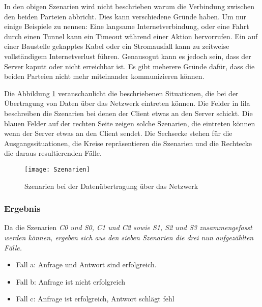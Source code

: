 %
%
In den obigen Szenarien wird nicht beschrieben warum die Verbindung zwischen den beiden Parteien abbricht. Dies kann verschiedene Gründe haben.
Um nur einige Beispiele zu nennen: Eine langsame Internetverbindung, oder eine Fahrt durch einen Tunnel kann ein Timeout während einer Aktion hervorrufen.
Ein auf einer Baustelle gekapptes Kabel oder ein Stromausfall kann zu zeitweise vollständigem Internetverlust führen.
Genausogut kann es jedoch sein, dass der Server kaputt oder nicht erreichbar ist. Es gibt meherere Gründe dafür, dass die beiden Parteien nicht mehr miteinander kommunizieren können.

Die Abbildung \ref{fig:szenarien} veranschaulicht die beschriebenen Situationen, die bei der Übertragung von Daten über das Netzwerk eintreten können.
Die Felder in lila beschreiben die Szenarien bei denen der Client etwas an den Server schickt.
Die blauen Felder auf der rechten Seite zeigen solche Szenarien, die eintreten können wenn der Server etwas an den Client sendet.
Die Sechsecke stehen für die Ausgangssituationen, die Kreise repräsentieren die Szenarien und die Rechtecke die daraus resultierenden Fälle.
\begin{figure}[H]
  \centering
  \texttt{[image: Szenarien]}
  \grayRule
  \caption{Szenarien bei der Datenübertragung über das Netzwerk}
  \label{fig:szenarien}
\end{figure}

%
%
\subsubsection*{Ergebnis}
Da die Szenarien \it{C0} und \it{S0}, \it{C1} und \it{C2} sowie \it{S1}, \it{S2} und \it{S3} zusammengefasst werden können, ergeben sich aus den sieben Szenarien die drei nun aufgezählten Fälle.
\begin{itemize}
  \item Fall a: Anfrage und Antwort sind erfolgreich.
  \item Fall b: Anfrage ist nicht erfolgreich
  \item Fall c: Anfrage ist erfolgreich, Antwort schlägt fehl
\end{itemize}